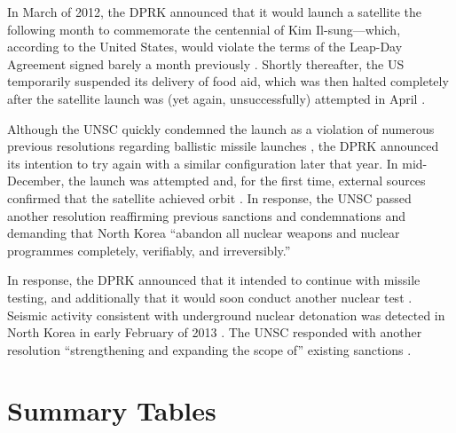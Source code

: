 In March of 2012, the DPRK announced that it would launch a satellite the following month to commemorate the centennial of Kim Il-sung---which, according to the United States, would violate the terms of the Leap-Day Agreement signed barely a month previously \cite{davenport}. Shortly thereafter, the US temporarily suspended its delivery of food aid, which was then halted completely after the satellite launch was (yet again, unsuccessfully) attempted in April \cite{davenport}.

Although the UNSC quickly condemned the launch as a violation of numerous previous resolutions regarding ballistic missile launches \cite{unsc12}, the DPRK announced its intention to try again with a similar configuration later that year. In mid-December, the launch was attempted and, for the first time, external sources confirmed that the satellite achieved orbit \cite{davenport}. In response, the UNSC passed another resolution reaffirming previous sanctions and condemnations and demanding that North Korea ``abandon all nuclear weapons and nuclear programmes completely, verifiably, and irreversibly.'' \cite{unsc13}

In response, the DPRK announced that it intended to continue with missile testing, and additionally that it would soon conduct another nuclear test \cite{davenport}. Seismic activity consistent with underground nuclear detonation was detected in North Korea in early February of 2013 \cite{davenport}. The UNSC responded with another resolution ``strengthening and expanding the scope of'' existing sanctions \cite{unsc13m}.

\section{Summary Tables}

